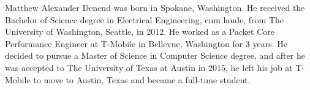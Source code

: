 \documentclass[12pt]{report}	%
\begin{document}

\begin{vita}
Matthew Alexander Denend was born in Spokane, Washington. He received the Bachelor of Science degree in Electrical Engineering, cum laude, from The University of Washington, Seattle, in 2012. He worked as a Packet Core Performance Engineer at T-Mobile in Bellevue, Washington for 3 years. He decided to pursue a Master of Science in Computer Science degree, and after he was accepted to The University of Texas at Austin in 2015, he left his job at T-Mobile to move to Austin, Texas and became a full-time student.
\end{vita}
\end{document}
